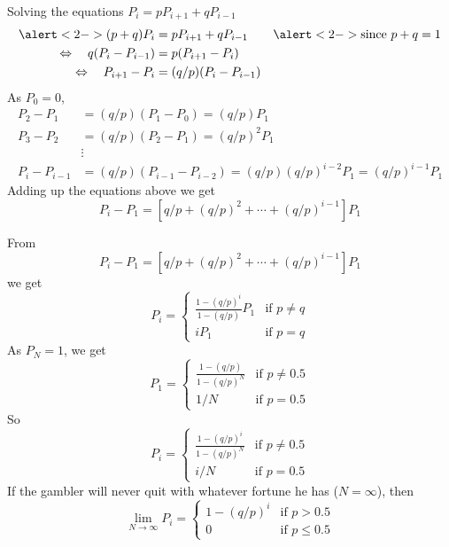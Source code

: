 \documentclass[letterpaper]{beamer}
\begin{document}
\begin{frame}{Solving the equations $P_i=pP_{i+1}+qP_{i-1}$}
\begin{align*}
\alert<2->{(p+q)}P_i&=pP_{i+1}+qP_{i-1}&\alert<2->{\text{since }p+q=1}\\
\Leftrightarrow\quad q(P_i- P_{i-1})&=p(P_{i+1}- P_i)\\
\Leftrightarrow\quad P_{i+1}- P_i&=(q/p)(P_i- P_{i-1})
\end{align*}
As $P_0=0$,
\begin{align*}
P_2- P_1&=(q/p)(P_1- P_0)=(q/p)P_1\\
P_3- P_2&=(q/p)(P_2- P_1)=(q/p)^2P_1\\[-3pt]
&\vdots\\[-3pt]
P_i- P_{i-1}
&=(q/p)(P_{i-1}-P_{i-2})=(q/p)(q/p)^{i-2}P_1=(q/p)^{i-1}P_1
\end{align*}
Adding up the equations above we get
\[P_i-P_1=\left[q/p+(q/p)^2+\cdots+(q/p)^{i-1}\right]P_1\]
\end{frame}
\begin{frame}
From
\[P_i-P_1=\left[q/p+(q/p)^2+\cdots+(q/p)^{i-1}\right]P_1\]
we get
\[
P_i=
\begin{cases}
\frac{1-(q/p)^i}{1-(q/p)}P_1 &\text{if }p\neq q\\
i P_1 &\text{if }p=q
\end{cases}
\]
As $P_N=1$, we get
\[
P_1=
\begin{cases}
\frac{1-(q/p)}{1-(q/p)^N} &\text{if }p\neq 0.5\\
1/N &\text{if }p=0.5
\end{cases}
\]
So
\[
P_i=
\begin{cases}
\frac{1-(q/p)^i}{1-(q/p)^N} &\text{if }p\neq 0.5\\
i/N &\text{if }p=0.5
\end{cases}
\]
If the gambler will never quit with whatever fortune he has ($N=\infty$),
then
\[
\lim_{N\to\infty}P_i=
\begin{cases}
1-(q/p)^i &\text{if }p>0.5\\
0 &\text{if }p\le 0.5
\end{cases}
\]
\end{frame}
\end{document}
